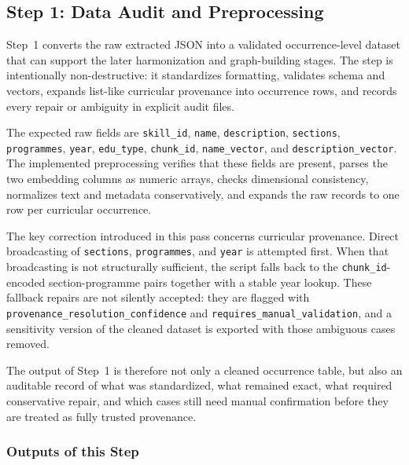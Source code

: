 \subsection{Step 1: Data Audit and Preprocessing}
\label{sec:step1_data_audit}

Step~1 converts the raw extracted JSON into a validated occurrence-level dataset that can support the later harmonization and graph-building stages. The step is intentionally non-destructive: it standardizes formatting, validates schema and vectors, expands list-like curricular provenance into occurrence rows, and records every repair or ambiguity in explicit audit files.

The expected raw fields are \texttt{skill\_id}, \texttt{name}, \texttt{description}, \texttt{sections}, \texttt{programmes}, \texttt{year}, \texttt{edu\_type}, \texttt{chunk\_id}, \texttt{name\_vector}, and \texttt{description\_vector}. The implemented preprocessing verifies that these fields are present, parses the two embedding columns as numeric arrays, checks dimensional consistency, normalizes text and metadata conservatively, and expands the raw records to one row per curricular occurrence.

The key correction introduced in this pass concerns curricular provenance. Direct broadcasting of \texttt{sections}, \texttt{programmes}, and \texttt{year} is attempted first. When that broadcasting is not structurally sufficient, the script falls back to the \texttt{chunk\_id}-encoded section-programme pairs together with a stable year lookup. These fallback repairs are not silently accepted: they are flagged with \texttt{provenance\_resolution\_confidence} and \texttt{requires\_manual\_validation}, and a sensitivity version of the cleaned dataset is exported with those ambiguous cases removed.

The output of Step~1 is therefore not only a cleaned occurrence table, but also an auditable record of what was standardized, what remained exact, what required conservative repair, and which cases still need manual confirmation before they are treated as fully trusted provenance.

\subsubsection{Outputs of this Step}
\label{sec:step1_outputs}

